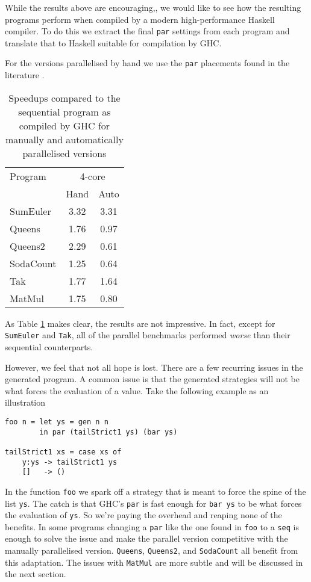 While the results above are encouraging,, we would like to see how the resulting
programs perform when compiled by a modern high-performance Haskell compiler.
To do this we extract the final \verb-par- settings from each program and
translate that to Haskell suitable for compilation by GHC.

For the versions parallelised by hand we use the \verb-par- placements found
in the literature \citep{vGMachine, runciman1994profiling}.

\begin{table}[ht]
\caption[Naive transfer to GHC]{Speedups compared to the sequential program as compiled by GHC for
         manually and automatically parallelised versions}
\centering
\smallskip
  \begin{tabular}{ l||c c }
    Program & \multicolumn{2}{c}{4-core} \\
            & Hand   & Auto         \\
    \hline
    SumEuler  & 3.32    & 3.31      \\
    Queens    & 1.76    & 0.97      \\
    Queens2   & 2.29    & 0.61     \\
    SodaCount & 1.25    & 0.64      \\
    Tak       & 1.77    & 1.64      \\
    MatMul    & 1.75    & 0.80      \\
  \end{tabular}
\label{tableGHC}
\end{table}

As Table \ref{tableGHC} makes clear, the results are not impressive. In fact,
except for \verb-SumEuler- and \verb-Tak-, all of the parallel benchmarks
performed \emph{worse} than their sequential counterparts.

However, we feel that not all hope is lost. There are a few recurring issues in
the generated program. A common issue is that the generated strategies will not
be what forces the evaluation of a value. Take the following example as an
illustration

\begin{verbatim}
foo n = let ys = gen n n
        in par (tailStrict1 ys) (bar ys)

tailStrict1 xs = case xs of
    y:ys -> tailStrict1 ys
    []   -> ()
\end{verbatim}

In the function \verb-foo- we spark off a strategy that is meant to force the
spine of the list \verb-ys-. The catch is that GHC's \verb-par- is fast enough
for \verb-bar ys- to be what forces the evaluation of \verb-ys-. So we're
paying the overhead and reaping none of the benefits. In some programs changing
a \verb-par- like the one found in \verb-foo- to a \verb-seq- is enough to
solve the issue and make the parallel version competitive with the manually
parallelised version.  \verb|Queens|, \verb|Queens2|, and \verb|SodaCount| all
benefit from this adaptation. The issues with \verb|MatMul| are more subtle and
will be discussed in the next section.
